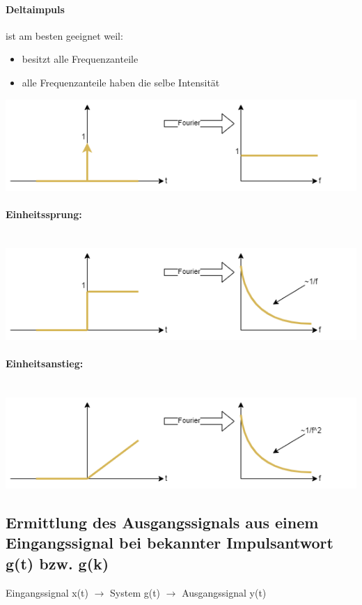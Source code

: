 \documentclass{article}
\begin{document}
\paragraph{Deltaimpuls} ist am besten geeignet weil: 
\begin{itemize}
	\item besitzt alle Frequenzanteile
	\item alle Frequenzanteile haben die selbe Intensität
\end{itemize}
\includegraphics[scale=0.8]{img/2024_11_25_fourier_deltaimpuls.png}

\paragraph{Einheitssprung:} \mbox{} \\
\includegraphics[scale=0.8]{img/2024_11_25_fourier_einheitssprung.png}

\paragraph{Einheitsanstieg:} \mbox{} \\
\includegraphics[scale=0.8]{img/2024_11_25_fourier_einheitsanstieg.png}

\subsection*{Ermittlung des Ausgangssignals aus einem Eingangssignal bei bekannter Impulsantwort g(t) bzw. g(k)}
Eingangssignal x(t) $\rightarrow$ System g(t) $\rightarrow$ Ausgangssignal y(t)
\end{document}

